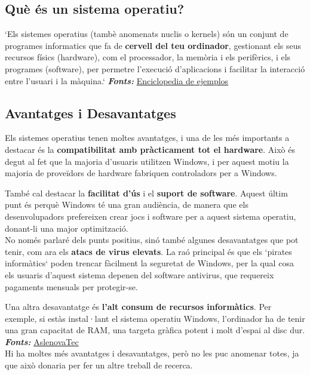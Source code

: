 \subsection{Què és un sistema operatiu?}
`Els sistemes operatius (tambè anomenats nuclis o kernels) són un conjunt de programes informatics que fa de \textbf{cervell del teu ordinador}, gestionant els seus recursos físics (hardware), com el processador, la memòria i els perifèrics, i els programes (software), per permetre l'execució d'aplicacions i facilitar la interacció entre l'usuari i la màquina.`  \textit{\textbf{Fonts:}} \href{https://www.ejemplos.co/20-ejemplos-de-sistemas-operativos/#:~:text=Un\%20Sistema\%20Operativo\%20(SO)\%20es,\%2C\%20MacOS\%2C\%20Windows\%2C\%20Haiku.}{Enciclopedia de ejemplos}
\subsection{Avantatges i Desavantatges}
Els sistemes operatius tenen moltes avantatges, i una de les més importants a destacar és la \textbf{compatibilitat amb pràcticament tot el hardware}. Això és degut al fet que la majoria d’usuaris utilitzen Windows, i per aquest motiu la majoria de proveïdors de hardware fabriquen controladors per a Windows.

També cal destacar la \textbf{facilitat d’ús} i el \textbf{suport de software}. Aquest últim punt és perquè Windows té una gran audiència, de manera que els desenvolupadors prefereixen crear jocs i software per a aquest sistema operatiu, donant-li una major optimització.\\

No només parlaré dels punts positius, sinó també algunes desavantatges que pot tenir, com ara els \textbf{atacs de virus elevats}. La raó principal és que els `pirates informàtics` poden trencar fàcilment la seguretat de Windows, per la qual cosa els usuaris d’aquest sistema depenen del software antivirus, que requereix pagaments mensuals per protegir-se.

Una altra desavantatge és \textbf{l’alt consum de recursos informàtics}. Per exemple, si estàs instal·lant el sistema operatiu Windows, l’ordinador ha de tenir una gran capacitat de RAM, una targeta gràfica potent i molt d’espai al disc dur.
\textit{\textbf{Fonts:}} \href{https://aslenovatec.com/reviews/ventajas-y-desventajas-del-sistema-operativo-windows/}{AslenovaTec}\\

Hi ha moltes més avantatges i desavantatges, però no les puc anomenar totes, ja que això donaria per fer un altre treball de recerca.

